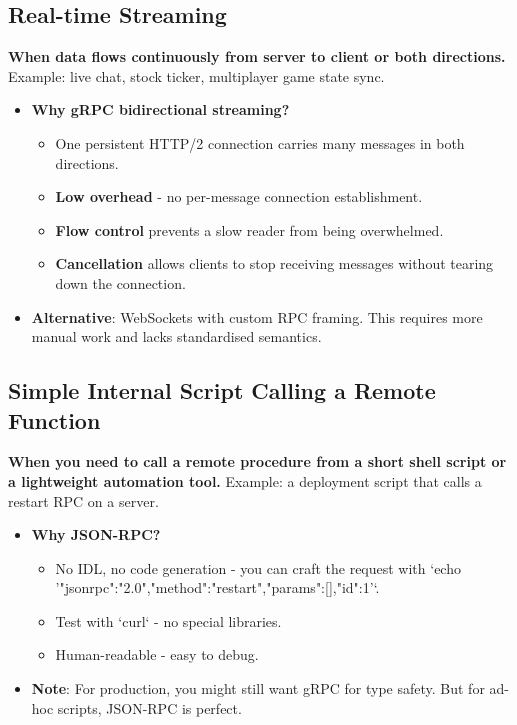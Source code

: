 \documentclass[10pt,a4paper]{article}
\begin{document}
\subsection{Real-time Streaming}
\textbf{When data flows continuously from server to client or both directions.} Example: live chat, stock ticker, multiplayer game state sync.

\begin{itemize}
    \item \textbf{Why gRPC bidirectional streaming?}
        \begin{itemize}
            \item One persistent HTTP/2 connection carries many messages in both directions.
            \item \textbf{Low overhead} - no per-message connection establishment.
            \item \textbf{Flow control} prevents a slow reader from being overwhelmed.
            \item \textbf{Cancellation} allows clients to stop receiving messages without tearing down the connection.
        \end{itemize}
    \item \textbf{Alternative}: WebSockets with custom RPC framing. This requires more manual work and lacks standardised semantics.
\end{itemize}

\subsection{Simple Internal Script Calling a Remote Function}
\textbf{When you need to call a remote procedure from a short shell script or a lightweight automation tool.} Example: a deployment script that calls a restart RPC on a server.

\begin{itemize}
    \item \textbf{Why JSON-RPC?}
        \begin{itemize}
            \item No IDL, no code generation - you can craft the request with `echo '{"jsonrpc":"2.0","method":"restart","params":[],"id":1}'`.
            \item Test with `curl` - no special libraries.
            \item Human-readable - easy to debug.
        \end{itemize}
    \item \textbf{Note}: For production, you might still want gRPC for type safety. But for ad-hoc scripts, JSON-RPC is perfect.
\end{itemize}
\end{document}
